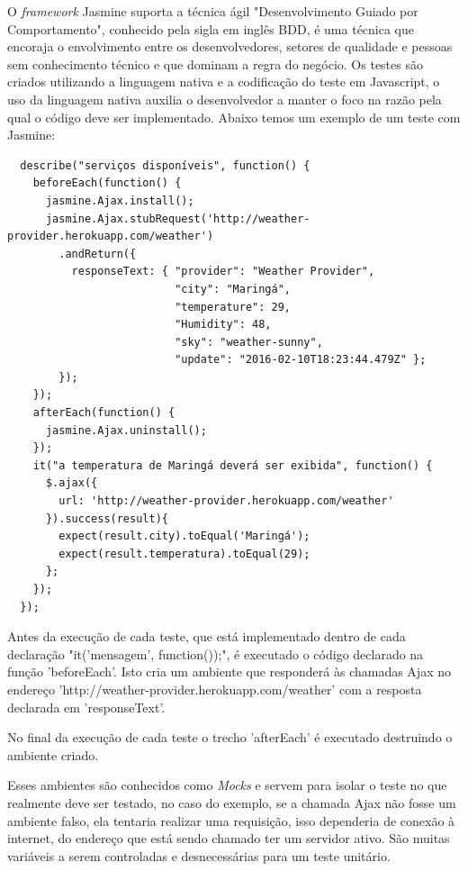 O \textit{framework} Jasmine suporta a técnica ágil "Desenvolvimento Guiado por Comportamento", conhecido pela sigla em inglês BDD, é uma técnica que encoraja o envolvimento entre os desenvolvedores, setores de qualidade e pessoas sem conhecimento técnico e que dominam a regra do negócio. Os testes são criados utilizando a linguagem nativa e a codificação do teste em Javascript, o uso da linguagem nativa auxilia o desenvolvedor a manter o foco na razão pela qual o código deve ser implementado.
Abaixo temos um exemplo de um teste com Jasmine:
\begin{footnotesize}
  \begin{verbatim}
  describe("serviços disponíveis", function() {
    beforeEach(function() {
      jasmine.Ajax.install();
      jasmine.Ajax.stubRequest('http://weather-provider.herokuapp.com/weather')
        .andReturn({
          responseText: { "provider": "Weather Provider",
                          "city": "Maringá",
                          "temperature": 29,
                          "Humidity": 48,
                          "sky": "weather-sunny",
                          "update": "2016-02-10T18:23:44.479Z" };
        });
    });
    afterEach(function() {
      jasmine.Ajax.uninstall();
    });
    it("a temperatura de Maringá deverá ser exibida", function() {
      $.ajax({
        url: 'http://weather-provider.herokuapp.com/weather'
      }).success(result){
        expect(result.city).toEqual('Maringá');
        expect(result.temperatura).toEqual(29);
      };
    });
  });
  \end{verbatim}
\end{footnotesize}

Antes da execução de cada teste, que está implementado dentro de cada declaração "it('mensagem', function(){});", é executado o código declarado na função 'beforeEach'. Isto cria um ambiente que responderá às chamadas Ajax no endereço 'http://weather-provider.herokuapp.com/weather' com a resposta declarada em 'responseText'.

No final da execução de cada teste o trecho 'afterEach' é executado destruindo o ambiente criado.

Esses ambientes são conhecidos como \textit{Mocks} e servem para isolar o teste no que realmente deve ser testado, no caso do exemplo, se a chamada Ajax não fosse um ambiente falso, ela tentaria realizar uma requisição, isso dependeria de conexão à internet, do endereço que está sendo chamado ter um servidor ativo. São muitas variáveis a serem controladas e desnecessárias para um teste unitário.

